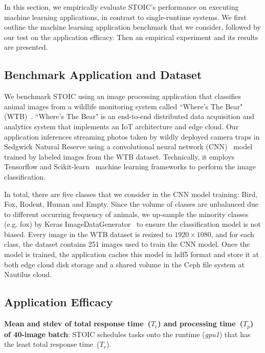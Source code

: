 In this section, we empirically evaluate STOIC's performance on executing machine learning applications, in contrast to single-runtime systems. We first outline the machine learning application benchmark that we consider, followed by our test on the application efficacy. Then an empirical experiment and its results are presented.

\subsection{Benchmark Application and Dataset}

We benchmark STOIC using an image processing application that classifies animal images from a wildlife monitoring system called ``Where's The Bear" (WTB)~\cite{ref:wtb}. ``Where's The Bear" is an end-to-end distributed data acquisition and analytics system that implements an IoT architecture and edge cloud. Our application inferences streaming photos taken by wildly deployed camera traps in Sedgwick Natural Reserve using a convolutional neural network (CNN)~\cite{ref:cnn} model trained by labeled images from the WTB dataset. Technically, it employs Tensorflow and Scikit-learn~\cite{ref:scikit} machine learning frameworks to perform the image classification.  

 In total, there are five classes that we consider in the CNN model training: Bird, Fox, Rodent, Human and Empty. Since the volume of classes are unbalanced due to different occurring frequency of animals, we up-sample the minority classes (e.g. fox) by Keras ImageDataGenerator~\cite{ref:keras} to ensure the classification model is not biased. Every image in the WTB dataset is resized to $1920 \times 1080$, and for each class, the dataset contains 251 images used to train the CNN model. Once the model is trained, the application caches this model in hdf5 format and store it at both edge cloud disk storage and a shared volume in the Ceph file system at Nautilus cloud. 

\subsection{Application Efficacy}

\begin{table}[t] \centering 

\caption{\textbf{Mean and stdev of total response time~($T_r$) and processing time~($T_p$) of 40-image batch}: STOIC schedules tasks onto the runtime (\textit{gpu1}) that has the least total response time~($T_r$).
\label{tab:validation}}
\end{table}

